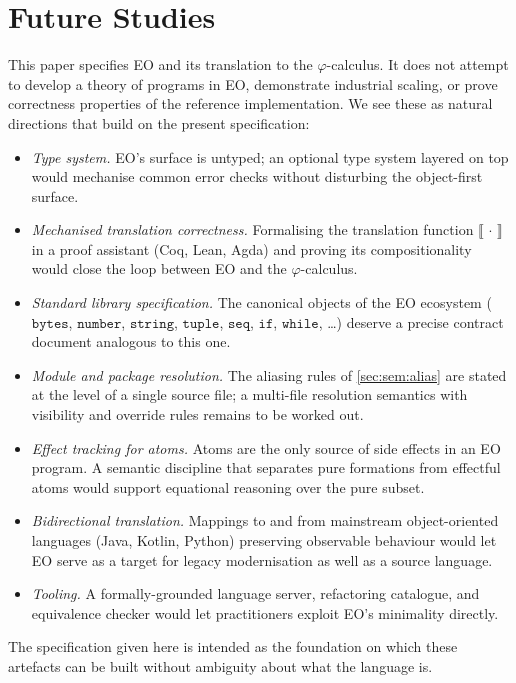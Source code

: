 
\section{Future Studies}\label{sec:future}

This paper specifies EO and its translation to the \(\varphi\)-calculus.
It does not attempt to develop a theory of programs in EO, demonstrate
  industrial scaling, or prove correctness properties of the reference
  implementation.
We see these as natural directions that build on the present
  specification:

\begin{itemize}
  \item \emph{Type system.}
    EO's surface is untyped; an optional type system layered on top
    would mechanise common error checks without disturbing the
    object-first surface.
  \item \emph{Mechanised translation correctness.}
    Formalising the translation function \(\llbracket\,\cdot\,\rrbracket\)
    in a proof assistant (Coq, Lean, Agda) and proving its compositionality
    would close the loop between EO and the \(\varphi\)-calculus.
  \item \emph{Standard library specification.}
    The canonical objects of the EO ecosystem
    (\(\mathtt{bytes}\), \(\mathtt{number}\), \(\mathtt{string}\),
    \(\mathtt{tuple}\), \(\mathtt{seq}\), \(\mathtt{if}\), \(\mathtt{while}\),
    \ldots) deserve a precise contract document analogous to this one.
  \item \emph{Module and package resolution.}
    The aliasing rules of \cref{sec:sem:alias} are stated at the level
    of a single source file; a multi-file resolution semantics with
    visibility and override rules remains to be worked out.
  \item \emph{Effect tracking for atoms.}
    Atoms are the only source of side effects in an EO program.
    A semantic discipline that separates pure formations from effectful
    atoms would support equational reasoning over the pure subset.
  \item \emph{Bidirectional translation.}
    Mappings to and from mainstream object-oriented languages (Java,
    Kotlin, Python) preserving observable behaviour would let EO serve
    as a target for legacy modernisation as well as a source language.
  \item \emph{Tooling.}
    A formally-grounded language server, refactoring catalogue,
    and equivalence checker would let practitioners exploit EO's
    minimality directly.
\end{itemize}

The specification given here is intended as the foundation on which these
  artefacts can be built without ambiguity about what the language is.
